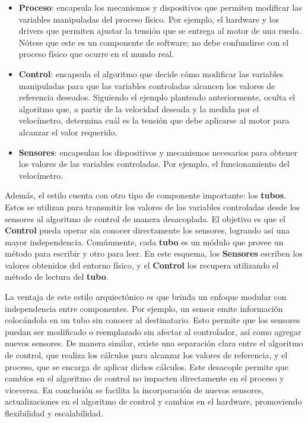 \begin{itemize}
\item \textbf{Proceso}: encapsula los mecanismos y dispositivos que permiten modificar las variables manipuladas del proceso físico. Por ejemplo, el hardware y los drivers que permiten ajustar la tensión que se entrega al motor de una rueda. Nótese que este es un componente de software; no debe confundirse con el proceso físico que ocurre en el mundo real.

\item \textbf{Control}: encapsula el algoritmo que decide cómo modificar las variables manipuladas para que las variables controladas alcancen los valores de referencia deseados. Siguiendo el ejemplo planteado anteriormente, oculta el algoritmo que, a partir de la velocidad deseada y la medida por el velocímetro, determina cuál es la tensión que debe aplicarse al motor para alcanzar el valor requerido.

\item \textbf{Sensores}: encapsulan los dispositivos y mecanismos necesarios para obtener los valores de las variables controladas. Por ejemplo, el funcionamiento del velocímetro.
\end{itemize}

Además, el estilo cuenta con otro tipo de componente importante: los \textbf{tubos}. Estos se utilizan para transmitir los valores de las variables controladas desde los sensores al algoritmo de control de manera desacoplada. El objetivo es que el \textbf{Control} pueda operar sin conocer directamente los sensores, logrando así una mayor independencia. Comúnmente, cada \textbf{tubo} es un módulo que provee un método para escribir y otro para leer. En este esquema, los \textbf{Sensores} escriben los valores obtenidos del entorno físico, y el \textbf{Control} los recupera utilizando el método de lectura del \textbf{tubo}.


La ventaja de este estilo arquiectónico es que brinda un enfoque modular con independencia entre componentes. Por ejemplo, un sensor emite información colocándola en un tubo sin conocer al destinatario. Esto permite que los sensores puedan ser modificado o reemplazado sin afectar al controlador, así como agregar nuevos sensores. De manera similar, existe una separación clara entre el algoritmo de control, que realiza los cálculos para alcanzar los valores de referencia, y el proceso, que se encarga de aplicar dichos cálculos. Este desacople permite que cambios en el algoritmo de control no impacten directamente en el proceso y viceversa. En conclusión se facilita la incorporación de nuevos sensores, actualizaciones en el algoritmo de control y cambios en el hardware, promoviendo flexibilidad y escalabilidad.



